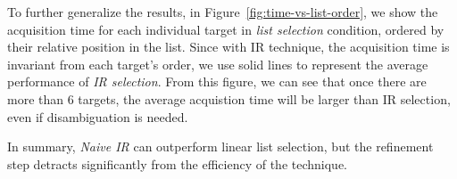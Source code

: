 To further generalize the results, in Figure~\ref{fig:time-vs-list-order}, we show the acquisition time for each individual target in {\em list selection} condition, ordered by their relative position in the list. Since with IR technique, the acquisition time is invariant from each target's order, we use solid lines to represent the average performance of {\em IR selection}. From this figure, we can see that once there are more than 6 targets, the average acquistion time will be larger than IR selection, even if disambiguation is needed. %

In summary, {\em Naive IR} can outperform linear list selection, but the refinement step detracts significantly from the efficiency of the technique.




